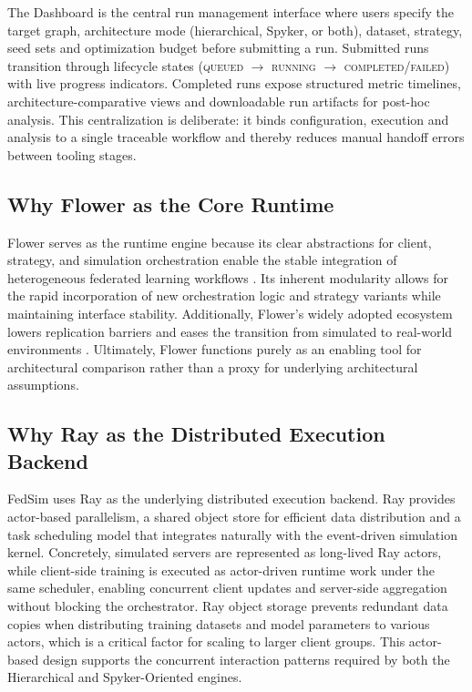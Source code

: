 \documentclass[conference]{IEEEtran}
\begin{document}
The Dashboard is the central run management interface where users specify the target graph, architecture mode (hierarchical, Spyker, or both), dataset, strategy, seed sets and optimization budget before submitting a run. Submitted runs transition through lifecycle states (\textsc{queued} $\to$ \textsc{running} $\to$ \textsc{completed}/\textsc{failed}) with live progress indicators. Completed runs expose structured metric timelines, architecture-comparative views and downloadable run artifacts for post-hoc analysis. This centralization is deliberate: it binds configuration, execution and analysis to a single traceable workflow and thereby reduces manual handoff errors between tooling stages.

\subsection{Why Flower as the Core Runtime}
Flower serves as the runtime engine because its clear abstractions for client, strategy, and simulation orchestration enable the stable integration of heterogeneous federated learning workflows \cite{flower}. Its inherent modularity allows for the rapid incorporation of new orchestration logic and strategy variants while maintaining interface stability. Additionally, Flower's widely adopted ecosystem lowers replication barriers and eases the transition from simulated to real-world environments \cite{flower}. Ultimately, Flower functions purely as an enabling tool for architectural comparison rather than a proxy for underlying architectural assumptions.

\subsection{Why Ray as the Distributed Execution Backend}
FedSim uses Ray \cite{moritz2018ray} as the underlying distributed execution backend. Ray provides actor-based parallelism, a shared object store for efficient data distribution and a task scheduling model that integrates naturally with the event-driven simulation kernel. Concretely, simulated servers are represented as long-lived Ray actors, while client-side training is executed as actor-driven runtime work under the same scheduler, enabling concurrent client updates and server-side aggregation without blocking the orchestrator. Ray object storage prevents redundant data copies when distributing training datasets and model parameters to various actors, which is a critical factor for scaling to larger client groups. This actor-based design supports the concurrent interaction patterns required by both the Hierarchical and Spyker-Oriented engines.
\end{document}
